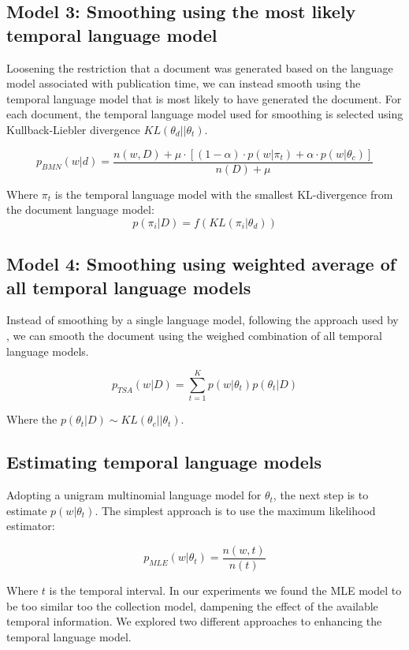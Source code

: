 \documentclass{sig-alternate}
\begin{document}
\subsection{Model 3: Smoothing using the most likely temporal language model}

Loosening the restriction that a document was generated based on the language model associated with publication time, we can instead smooth using the temporal language model that is most likely to have generated the document. For each document, the temporal language model used for smoothing is selected using Kullback-Liebler divergence $KL(\theta_d || \theta_t)$.

\[
p_{BMN}(w \vert d) = \dfrac{n(w,D) + \mu \cdot \left[ (1-\alpha) \cdot p(w\vert \pi_t) + \alpha \cdot p(w \vert \theta_c)\right]}{n(D) + \mu}
\]

Where $\pi_t$ is the temporal language model with the smallest KL-divergence from the document language model:
\[
p(\pi_i \vert D) = f(KL(\pi_i \vert \theta_d))
\]

\subsection{Model 4: Smoothing using weighted average of all temporal language models}

Instead of smoothing by a single language model, following the approach used by \cite{Wei2006}, we can smooth the document using the weighed combination of all temporal language models.

\[
p_{TSA}(w \vert D)= \sum_{t=1}^{K} p(w \vert \theta_t) p(\theta_t \vert D)
\]

Where the $p(\theta_t \vert D) \sim KL(\theta_c \vert\vert \theta_t)$.


\subsection{Estimating temporal language models}

Adopting a unigram multinomial language model for $\theta_t$, the next step is to estimate $p(w \vert \theta_t)$.  
The simplest approach is to use the maximum likelihood estimator:

\[
p_{MLE} (w \vert \theta_t) = \dfrac{n(w, t)}{n(t)}
\]

Where $t$ is the temporal interval. In our experiments we found the MLE model to be too similar too 
the collection model, dampening the effect of the available temporal information. We explored two
different approaches to enhancing the temporal language model.  
\end{document}
